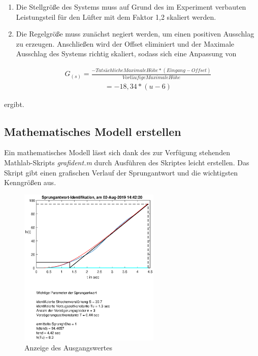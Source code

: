 \documentclass[10pt]{scrartcl}
\begin{document}
\begin{enumerate}
\item Die Stellgröße des Systems muss auf Grund des im Experiment verbauten Leistungsteil für den Lüfter mit dem Faktor 1,2 skaliert werden.
\item Die Regelgröße muss zunächst negiert werden, um einen positiven Ausschlag zu erzeugen. Anschließen wird der Offset eliminiert und der Maximale Ausschlag des Systems richtig skaliert, sodass sich eine Anpassung von


\begin{align}
   G_{(s)}=\frac{-Tatsächliche Maximale Höhe*(Eingang-Offset)}{Vorläufige Maximale Höhe}
\end{align}
\begin{align}
= -18,34*(u-6)
\end{align}
\end{enumerate}
ergibt.


\subsection{Mathematisches Modell erstellen}
Ein mathematisches Modell lässt sich dank des zur Verfügung stehenden Mathlab-Skripts \textit {grafident.m} durch Ausführen des Skriptes leicht erstellen. Das Skript gibt einen grafischen Verlauf der Sprungantwort und die wichtigsten Kenngrößen aus.

\begin{figure}[H]
	\centering
	\includegraphics[width=0.6\textwidth]{SchwMod}
	\caption{Anzeige des Ausgangswertes}
	\label{img:grafik-dummy}
\end{figure}
\end{document}
